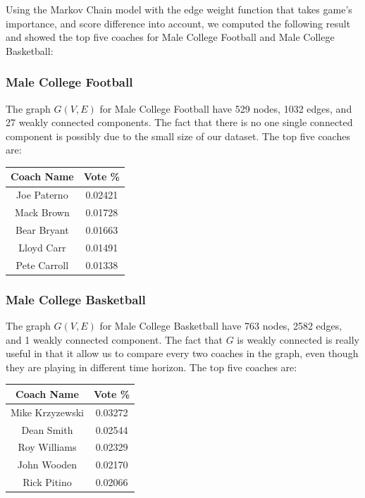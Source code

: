 \documentclass[11pt,notitlepage]{article}
\begin{document}
Using the Markov Chain model with the edge weight function that takes game's importance, and score difference into account, we computed the following result and showed the top five coaches for Male College Football and Male College Basketball:

\subsubsection*{Male College Football}

\noindent The graph $G(V, E)$ for Male College Football have 529 nodes, 1032 edges, and 27 weakly connected components. The fact that there is no one single connected component is possibly due to the small size of our dataset. The top five coaches are:

\begin{center}
\begin{tabular}{ | c | c | }
\hline
Coach Name   & Vote \% \\\hline
Joe Paterno  & 0.02421 \\\hline
Mack Brown   & 0.01728 \\\hline
Bear Bryant  & 0.01663 \\\hline
Lloyd Carr   & 0.01491 \\\hline
Pete Carroll & 0.01338 \\
\hline
\end{tabular}
\end{center}

\subsubsection*{Male College Basketball}

\noindent The graph $G(V, E)$ for Male College Basketball have 763 nodes, 2582 edges, and 1 weakly connected component. The fact that $G$ is weakly connected is really useful in that it allow us to compare every two coaches in the graph, even though they are playing in different time horizon. The top five coaches are:

\begin{center}
\begin{tabular}{ | c | c | }
\hline
Coach Name  & Vote \% \\\hline
Mike Krzyzewski & 0.03272 \\\hline
Dean Smith  & 0.02544 \\\hline
Roy Williams & 0.02329 \\\hline
John Wooden  & 0.02170 \\\hline
Rick Pitino  & 0.02066 \\
\hline
\end{tabular}
\end{center}
\end{document}
